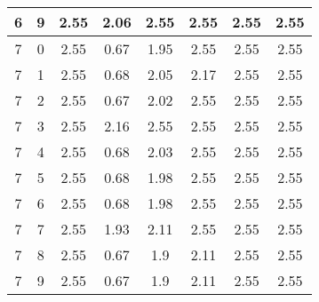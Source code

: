 \begin{longtable}{|c|c||c||c|c|c||c|c|}
	6 & 9 & 2.55 & 2.06 & 2.55 & 2.55 & 2.55 & 2.55 \\ \hline
	7 & 0 & 2.55 & 0.67 & 1.95 & 2.55 & 2.55 & 2.55 \\ \hline
	7 & 1 & 2.55 & 0.68 & 2.05 & 2.17 & 2.55 & 2.55 \\ \hline
	7 & 2 & 2.55 & 0.67 & 2.02 & 2.55 & 2.55 & 2.55 \\ \hline
	7 & 3 & 2.55 & 2.16 & 2.55 & 2.55 & 2.55 & 2.55 \\ \hline
	7 & 4 & 2.55 & 0.68 & 2.03 & 2.55 & 2.55 & 2.55 \\ \hline
	7 & 5 & 2.55 & 0.68 & 1.98 & 2.55 & 2.55 & 2.55 \\ \hline
	7 & 6 & 2.55 & 0.68 & 1.98 & 2.55 & 2.55 & 2.55 \\ \hline
	7 & 7 & 2.55 & 1.93 & 2.11 & 2.55 & 2.55 & 2.55 \\ \hline
	7 & 8 & 2.55 & 0.67 & 1.9 & 2.11 & 2.55 & 2.55 \\ \hline
	7 & 9 & 2.55 & 0.67 & 1.9 & 2.11 & 2.55 & 2.55 \\ \hline
\end{longtable}
\clearpage{}
